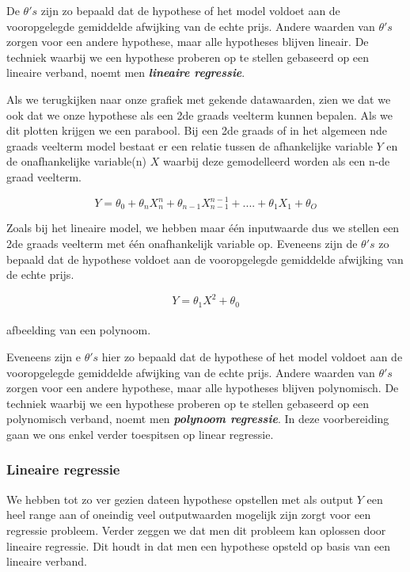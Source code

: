 De $\theta's$ zijn zo bepaald dat de hypothese of het model voldoet aan de vooropgelegde gemiddelde afwijking van de echte prijs. Andere waarden van $\theta's$ zorgen voor een andere  hypothese, maar alle hypotheses blijven lineair. De techniek waarbij we een hypothese proberen op te stellen gebaseerd op een lineaire verband, noemt men \textbf{\textit{lineaire regressie}}. 

Als we terugkijken naar onze grafiek met gekende datawaarden, zien we dat we ook dat we onze hypothese als een 2de graads veelterm kunnen bepalen. Als we dit plotten krijgen we een parabool. Bij een 2de graads of in het algemeen nde graads veelterm model bestaat er een relatie tussen de afhankelijke variable $Y$ en de onafhankelijke variable(n) $X$ waarbij deze gemodelleerd worden als een n-de graad veelterm.

\[Y = \theta_{0} + \theta_{n}X^{n}_{n} + \theta_{n-1}X^{n-1}_{n-1} + .... +  \theta_{1}X_{1} + \theta_{O} \]

Zoals bij het lineaire model, we hebben maar \'e\'en inputwaarde dus we stellen een 2de graads veelterm met \'e\'en onafhankelijk variable op.
Eveneens zijn de $\theta's$ zo bepaald dat de hypothese voldoet aan de vooropgelegde gemiddelde afwijking van de echte prijs.  

\[Y = \theta_{1}X^{2} + \theta_{0}\]\\ afbeelding van een polynoom.

Eveneens zijn e $\theta's$ hier zo bepaald dat de hypothese of het model voldoet aan de vooropgelegde gemiddelde afwijking van de echte prijs. Andere waarden van $\theta's$ zorgen voor een andere  hypothese, maar alle hypotheses blijven polynomisch. De techniek waarbij we een hypothese proberen op te stellen gebaseerd op een polynomisch verband, noemt men \textbf{\textit{polynoom regressie}}. 
\newline
In deze voorbereiding gaan we ons enkel verder toespitsen op linear regressie. 

\subsubsection{Lineaire regressie}\label{lineaire regressie}

We hebben tot zo ver gezien dateen hypothese opstellen met als output $Y$ een heel range aan of oneindig veel outputwaarden mogelijk zijn zorgt voor een regressie probleem. Verder zeggen we dat men dit probleem kan oplossen door lineaire regressie. Dit houdt in dat men een hypothese opsteld op basis van een lineaire verband.


